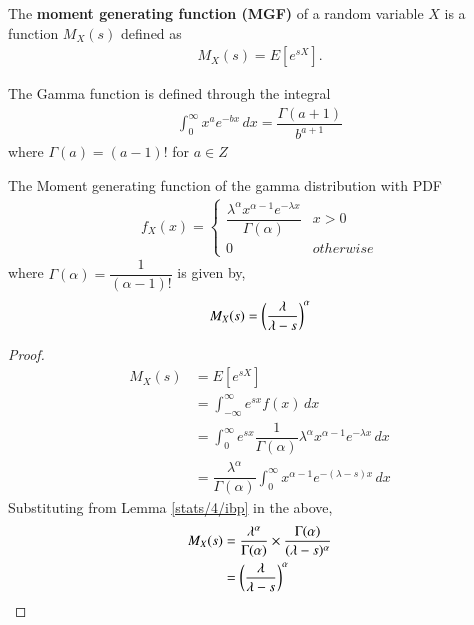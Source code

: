     \begin{definition}
    The \textbf{moment generating function (MGF)} of a random variable $X$ is a function $ M_X(s) $ defined as
    \begin{align}
        M_X(s) = E[e^{sX}].
    \end{align}
    \end{definition}
    \begin{lemma}
    \label{stats/4/ibp}
    The Gamma function is defined through the integral
    \begin{align}
        \int_{0}^{\infty} x^a e^{-bx}\,dx = \dfrac{\Gamma(a+1)}{b^{a+1}}
        \label{stats/4/eqidentity}
    \end{align}
    where $ \Gamma(a) = (a-1)!$ for $ a \in Z$
    \end{lemma}
    \begin{theorem}
     The Moment generating function of the gamma distribution with PDF
     \begin{align}
    f_{X}(x)  = 
    \begin{cases}
    \dfrac{\lambda^{\alpha}x^{\alpha-1}e^{-\lambda x}}{\Gamma(\alpha)} &  x > 0
    \\
    0 & otherwise
    \end{cases}
    \end{align}
    where $ \Gamma(\alpha) = \dfrac{1}{(\alpha-1)!}$
    is given by,
    \begin{align}
        M_X(s) = \left(\dfrac{\lambda}{\lambda-s}\right)^{\alpha}
    \end{align}
    \end{theorem}
    \begin{proof}
    \begin{align}
        M_X(s) &= E[e^{sX}] \\
        &=  \int_{-\infty}^{\infty} e^{sx} f(x)\,dx \\
        &=    \int_{0}^{\infty} e^{sx} \dfrac{1}{\Gamma(\alpha)} \lambda^\alpha x^{\alpha-1}e^{-\lambda x}\,dx \\
        &= \dfrac{\lambda^\alpha}{\Gamma(\alpha)} \int_{0}^{\infty} x^{\alpha-1} e^{-(\lambda - s) x}\,dx 
    \end{align}
    Substituting from Lemma \ref{stats/4/ibp} in the above,
    \begin{align}
         M_X(s) &= \dfrac{\lambda^\alpha}{\Gamma(\alpha)} \times \dfrac{\Gamma(\alpha)}{(\lambda-s)^\alpha} \\
         &= \left(\dfrac{\lambda}{\lambda-s}\right)^\alpha
    \end{align}
    \end{proof}
